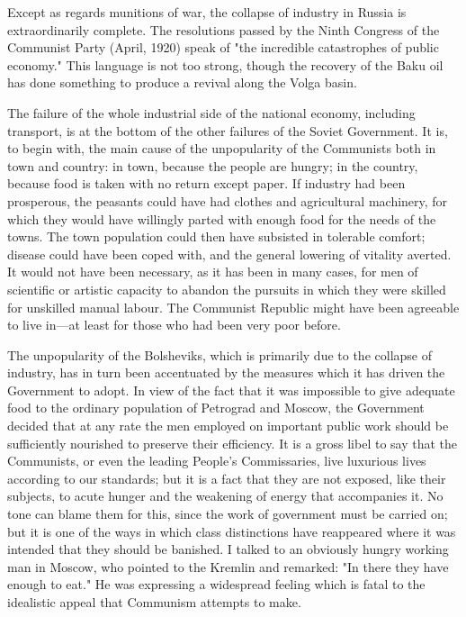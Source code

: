 Except as regards munitions of war, the collapse of industry in Russia is extraordinarily complete. The resolutions passed by the Ninth Congress of the Communist Party (April, 1920) speak of "the incredible catastrophes of public economy." This language is not too strong, though the recovery of the Baku oil has done something to produce a revival along the Volga basin.

The failure of the whole industrial side of the national economy, including transport, is at the bottom of the other failures of the Soviet Government. It is, to begin with, the main cause of the unpopularity of the Communists both in town and country: in town, because the people are hungry; in the country, because food is taken with no return except paper. If industry had been prosperous, the peasants could have had clothes and agricultural machinery, for which they would have willingly parted with enough food for the needs of the towns. The town population could then have subsisted in tolerable comfort; disease could have been coped with, and the general lowering of vitality averted. It would not have been necessary, as it has been in many cases, for men of scientific or artistic capacity to abandon the pursuits in which they were skilled for unskilled manual labour. The Communist Republic might have been agreeable to live in---at least for those who had been very poor before.

The unpopularity of the Bolsheviks, which is primarily due to the collapse of industry, has in turn been accentuated by the measures which it has driven the Government to adopt. In view of the fact that it was impossible to give adequate food to the ordinary population of Petrograd and Moscow, the Government decided that at any rate the men employed on important public work should be sufficiently nourished to preserve their efficiency. It is a gross libel to say that the Communists, or even the leading People's Commissaries, live luxurious lives according to our standards; but it is a fact that they are not exposed, like their subjects, to acute hunger and the weakening of energy that accompanies it. No tone can blame them for this, since the work of government must be carried on; but it is one of the ways in which class distinctions have reappeared where it was intended that they should be banished. I talked to an obviously hungry working man in Moscow, who pointed to the Kremlin and remarked: "In there they have enough to eat." He was expressing a widespread feeling which is fatal to the idealistic appeal that Communism attempts to make.

